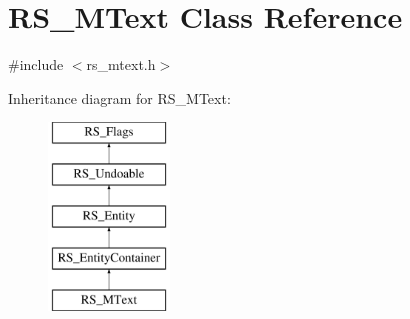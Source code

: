 \hypertarget{classRS__MText}{\section{R\-S\-\_\-\-M\-Text Class Reference}
\label{classRS__MText}
}


{\ttfamily \#include $<$rs\-\_\-mtext.\-h$>$}

Inheritance diagram for R\-S\-\_\-\-M\-Text\-:\begin{figure}[H]
\begin{center}
\leavevmode
\includegraphics[height=5.000000cm]{classRS__MText}
\end{center}
\end{figure}
